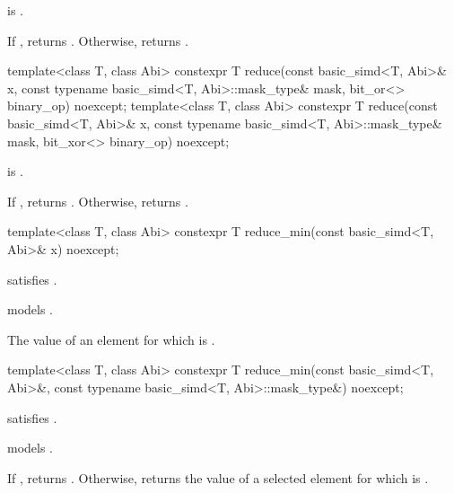 \begin{itemdescr}
  \pnum\constraints
   is .

  \pnum\returns
  If , returns . Otherwise, returns  \forallmaskedi.
\end{itemdescr}

\begin{itemdecl}
template<class T, class Abi>
  constexpr T reduce(const basic_simd<T, Abi>& x, const typename basic_simd<T, Abi>::mask_type& mask,
                     bit_or<> binary_op) noexcept;
template<class T, class Abi>
  constexpr T reduce(const basic_simd<T, Abi>& x, const typename basic_simd<T, Abi>::mask_type& mask,
                     bit_xor<> binary_op) noexcept;
\end{itemdecl}

\begin{itemdescr}
  \pnum\constraints
   is .

  \pnum\returns
  If , returns . Otherwise, returns  \forallmaskedi.
\end{itemdescr}

\begin{itemdecl}
template<class T, class Abi> constexpr T reduce_min(const basic_simd<T, Abi>& x) noexcept;
\end{itemdecl}

\begin{itemdescr}
  \pnum\constraints
   satisfies .

  \pnum\expects
   models .

  \pnum\returns
  The value of an element  for which  is  \foralli.
\end{itemdescr}

\begin{itemdecl}
template<class T, class Abi>
  constexpr T reduce_min(const basic_simd<T, Abi>&, const typename basic_simd<T, Abi>::mask_type&) noexcept;
\end{itemdecl}

\begin{itemdescr}
  \pnum\constraints
   satisfies .

  \pnum\expects
   models .

  \pnum\returns
  If , returns .
  Otherwise, returns the value of a selected element  for which  is  \forallmaskedi.
\end{itemdescr}

